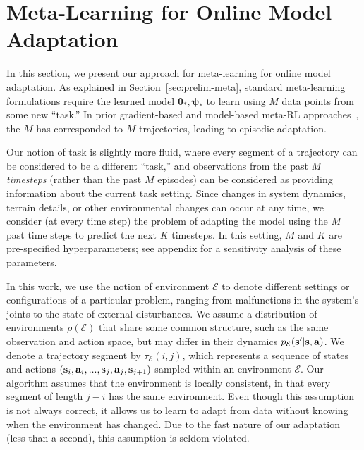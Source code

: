 \vspsec
\section{Meta-Learning for Online Model Adaptation}\label{sec:ml4ac}
\vspsec
In this section, we present our approach for meta-learning for online model adaptation. As explained in Section~\ref{sec:prelim-meta}, standard meta-learning formulations require the learned model $\bm{\theta}_*, \bm{\psi}_*$ to learn using $M$ data points from some new ``task.'' In prior gradient-based and model-based meta-RL approaches~\citep{finn2017maml,saemundsson2018meta}, the $M$ has corresponded to $M$ trajectories, leading to episodic adaptation.

Our notion of task is slightly more fluid, where every segment of a trajectory can be considered to be a different ``task,'' and observations from the past $M$ \emph{timesteps} (rather than the past $M$ episodes) can be considered as providing information about the current task setting. 
Since changes in system dynamics, terrain details, or other environmental changes can occur at any time, we consider (at every time step) the problem of adapting the model using the $M$ past time steps to predict the next $K$ timesteps. In this setting, $M$ and $K$  are pre-specified hyperparameters; see appendix for a sensitivity analysis of these parameters.

In this work, we use the notion of environment $\mathcal{E}$ to denote different settings or configurations of a particular problem, ranging from malfunctions in the system's joints to the state of external disturbances. We assume a distribution of environments $\rho({\mathcal{E}})$ that share some common structure, such as the same observation and action space, but may differ in their dynamics $p_\mathcal{E}({\bf s'}|{\bf s}, {\bf a})$. We denote a trajectory segment by $\tau_{\mathcal{E}}(i, j)$, which represents a sequence of states and actions
$({\bf s}_{i}, {\bf a}_{i}, ..., {\bf s}_{j}, {\bf a}_{j}, {\bf s}_{j+1})$ sampled within an environment $\mathcal{E}$. Our algorithm assumes that the environment is locally consistent, in that every segment of length $j-i$ has the same environment. Even though this assumption is not always correct, it allows us to learn to adapt from data without knowing when the environment has changed. Due to the fast nature of our adaptation (less than a second), this assumption is seldom violated.

